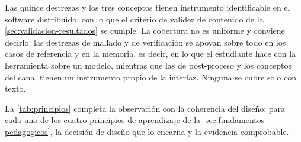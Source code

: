 Las quince destrezas y los tres conceptos tienen instrumento identificable en el software distribuido, con lo que el criterio de validez de contenido de la \autoref{sec:validacion-resultados} se cumple. La cobertura no es uniforme y conviene decirlo: las destrezas de mallado y de verificación se apoyan sobre todo en los casos de referencia y en la memoria, es decir, en lo que el estudiante hace con la herramienta sobre un modelo, mientras que las de post-proceso y los conceptos del canal tienen un instrumento propio de la interfaz. Ninguna se cubre solo con texto.

La \autoref{tab:principios} completa la observación con la coherencia del diseño: para cada uno de los cuatro principios de aprendizaje de la \autoref{sec:fundamentos-pedagogicos}, la decisión de diseño que lo encarna y la evidencia comprobable.

